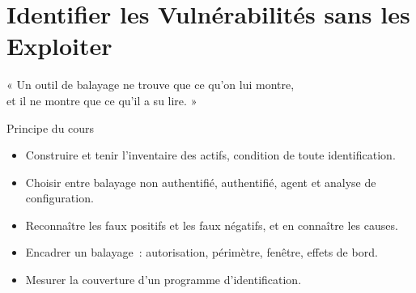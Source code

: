 
\chapter{Identifier les Vulnérabilités sans les Exploiter}
\label{chap:identifier}

\epigraph{%
    « Un outil de balayage ne trouve que ce qu'on lui montre,\\
    et il ne montre que ce qu'il a su lire. »%
}{Principe du cours}


\begin{boxobjectifs}
\begin{itemize}
    \item Construire et tenir l'inventaire des actifs, condition de toute
          identification.
    \item Choisir entre balayage non authentifié, authentifié, agent et
          analyse de configuration.
    \item Reconnaître les faux positifs et les faux négatifs, et en
          connaître les causes.
    \item Encadrer un balayage~: autorisation, périmètre, fenêtre, effets
          de bord.
    \item Mesurer la couverture d'un programme d'identification.
\end{itemize}
\end{boxobjectifs}

